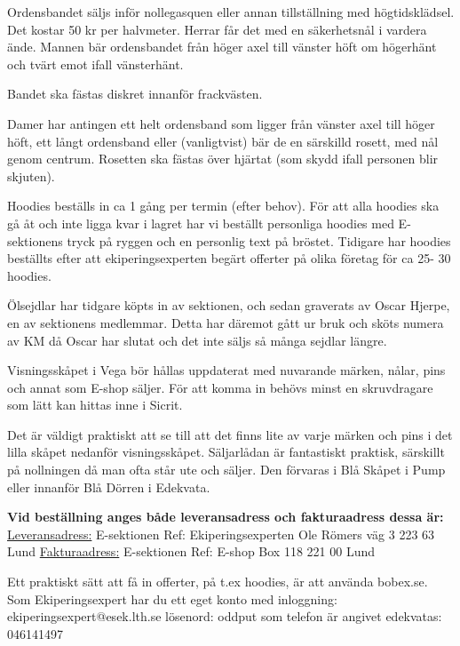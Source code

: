 \documentclass[10pt]{article}
\begin{document}
    Ordensbandet säljs inför nollegasquen eller annan tillställning med högtidsklädsel. Det kostar 50 kr per halvmeter. Herrar får det med en säkerhetsnål i vardera ände. Mannen bär ordensbandet från höger axel till vänster höft om högerhänt och tvärt emot ifall vänsterhänt.

    Bandet ska fästas diskret innanför frackvästen.

    Damer har antingen ett helt ordensband som ligger från vänster axel till höger höft, ett långt ordensband eller (vanligtvist) bär de en särskilld rosett, med nål genom centrum. Rosetten ska fästas över hjärtat (som skydd ifall personen blir skjuten).

    Hoodies beställs in ca 1 gång per termin (efter behov). För att alla hoodies ska gå åt och inte ligga kvar i lagret har vi beställt personliga hoodies med E-sektionens tryck på ryggen och en personlig text på bröstet. Tidigare har hoodies beställts efter att ekiperingsexperten begärt offerter på olika företag för ca 25- 30 hoodies.

    Ölsejdlar har tidgare köpts in av sektionen, och sedan graverats av Oscar Hjerpe, en av sektionens medlemmar. Detta har däremot gått ur bruk och sköts numera av KM då Oscar har slutat och det inte säljs så många sejdlar längre.

    Visningsskåpet i Vega bör hållas uppdaterat med nuvarande märken, nålar, pins och annat som E-shop säljer. För att komma in behövs minst en skruvdragare som lätt kan hittas inne i Sicrit.

    Det är väldigt praktiskt att se till att det finns lite av varje märken och pins i det lilla skåpet nedanför visningsskåpet. Säljarlådan är fantastiskt praktisk, särskillt på nollningen då man ofta står ute och säljer. Den förvaras i Blå Skåpet i Pump eller innanför Blå Dörren i Edekvata.

    \textbf{Vid beställning anges både leveransadress och fakturaadress dessa är:} \newline
    \underline{Leveransadress:} E-sektionen Ref: Ekiperingsexperten Ole Römers väg 3 223 63 Lund \newline
    \underline{Fakturaadress:} E-sektionen Ref: E-shop Box 118 221 00 Lund

    Ett praktiskt sätt att få in offerter, på t.ex hoodies, är att använda bobex.se. Som Ekiperingsexpert har du ett eget konto med inloggning: ekiperingsexpert@esek.lth.se lösenord: oddput som telefon är angivet edekvatas: 046141497
\end{document}

